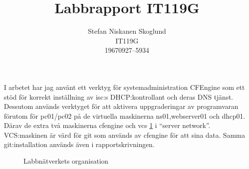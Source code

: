 \documentclass[swedish,10pt,a4paper]{article}
\title{Labbrapport IT119G}
\author{Stefan Niskanen Skoglund\\IT119G\\19670927--5934}
\begin{document}
\maketitle

I arbetet har jag använt ett verktyg för systemadministration CFEngine
som ett stöd för korrekt inställning av isc:s DHCP:kontrollant
och deras DNS tjänst.
Dessutom används verktyget för att aktivera uppgraderingar av programvaran
förutom för pc01/pc02 på de virtuella maskinerna ns01,webserver01 och dhcp01.
Därav de extra två maskinerna cfengine och vcs \ref{network_organization} i ``server network''.
VCS:maskinen är värd för git som används av cfengine för att sina data.
Samma git:installation används även i rapportskrivningen.

\begin{figure}
  \centering
  \caption{Labbnätverkets organisation}
  \label{network_organization}
\end{figure}
\end{document}
